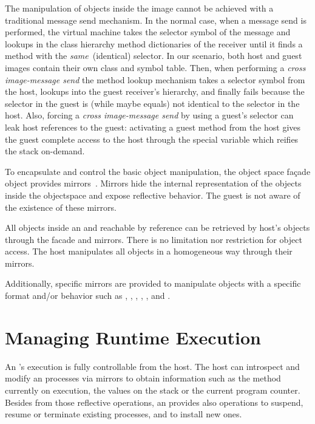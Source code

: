 The manipulation of objects inside the \objectspace image cannot be achieved with a traditional message send mechanism. In the normal case, when a message send is performed, the virtual machine takes the selector symbol of the message and lookups in the class hierarchy method dictionaries of the receiver until it finds a method with the \emph{same}~(identical) selector. In our scenario, both host and guest images contain their own  class and symbol table. Then, when performing a \emph{cross image-message send} the method lookup mechanism takes a selector symbol from the host, lookups into the guest receiver's hierarchy, and finally fails because  the selector in the guest is (while maybe equals) not identical to the selector in the host. Also, forcing a \emph{cross image-message send} by using a guest's selector can leak host references to the guest: activating a guest method from the host gives the guest complete access to the host through the  special variable which reifies the stack on-demand.

To encapsulate and control the basic object manipulation, the object space fa\c{c}ade object provides mirrors~\cite{Brac04b}. Mirrors hide the internal representation of the objects inside the objectspace and expose reflective behavior. The guest is not aware of the existence of these mirrors.

All objects inside an \objectspace and reachable by reference can be retrieved by host's objects through the \objectspace facade and mirrors. 
There is no limitation nor restriction for object access. 
The host manipulates all objects in a homogeneous way through their mirrors. 

Additionally, specific mirrors are provided to manipulate objects with a specific format and/or behavior such as , , , , , and .

\section{Managing Runtime Execution} \label{sec:execution}

An \objectspace's execution is fully controllable from the host. The host can introspect and modify an \objectspace processes via mirrors to obtain information such as the method currently on execution, the values on the stack or the current program counter. Besides from those reflective operations, an \objectspace provides also operations to suspend, resume or terminate existing processes, and to install new ones.

